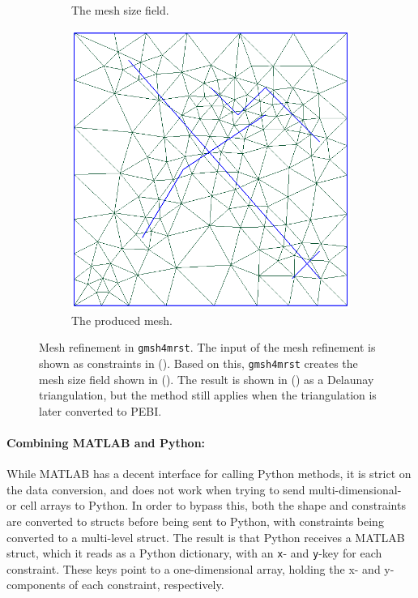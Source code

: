 \begin{figure}[ht]
\begin{subfigure}[b]{0.32\textwidth}
        \caption{The mesh size field.}
        \label{fig:fig:mesh-refinement-field}
    \end{subfigure}
    \begin{subfigure}[b]{0.32\textwidth}
        \centering
        \includegraphics[width=\textwidth]{report/Images/Combining software/Mesh refinement/mesh_refinement_mesh.png}
        \caption{The produced mesh.}
        \label{fig:fig:mesh-refinement-mesh}
    \end{subfigure}
    \caption[Mesh refinement in \texttt{gmsh4mrst}.]{Mesh refinement in \texttt{gmsh4mrst}. The input of the mesh refinement is shown as constraints in (). Based on this, \texttt{gmsh4mrst} creates the mesh size field shown in (). The result is shown in () as a Delaunay triangulation, but the method still applies when the triangulation is later converted to PEBI.}
    \label{fig:mesh-refinement}
\end{figure}


\paragraph{Combining MATLAB and Python:}
While MATLAB has a decent interface for calling Python methods, it is strict on the data conversion, and does not work when trying to send multi-dimensional- or cell arrays to Python. In order to bypass this, both the shape and constraints are converted to structs before being sent to Python, with constraints being converted to a multi-level struct. The result is that Python receives a MATLAB struct, which it reads as a Python dictionary, with an \verb|x|- and \verb|y|-key for each constraint. These keys point to a one-dimensional array, holding the x- and y-components of each constraint, respectively.


